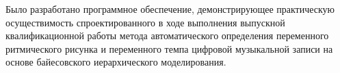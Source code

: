 
Было разработано программное обеспечение, демонстрирующее практическую осуществимость спроектированного в ходе выполнения выпускной квалификационной работы метода автоматического определения переменного ритмического рисунка и переменного темпа цифровой музыкальной записи на основе байесовского иерархического моделирования.